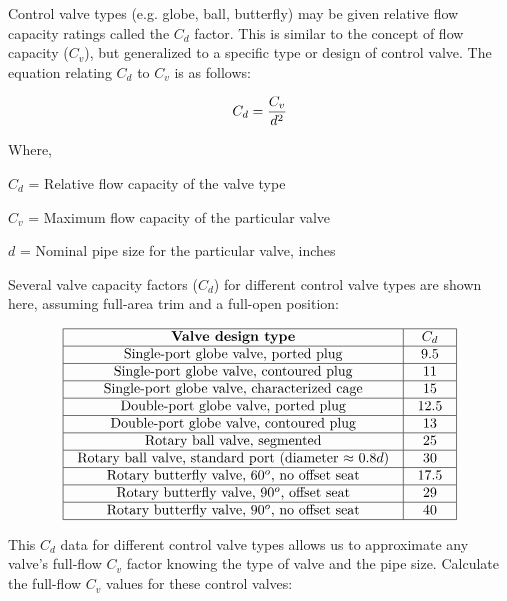 

Control valve types (e.g. globe, ball, butterfly) may be given relative flow capacity ratings called the $C_d$ factor.  This is similar to the concept of flow capacity ($C_v$), but generalized to a specific type or design of control valve.  The equation relating $C_d$ to $C_v$ is as follows:

$$C_d = {C_v \over d^2}$$

\noindent
Where,

$C_d$ = Relative flow capacity of the valve type

$C_v$ = Maximum flow capacity of the particular valve

$d$ = Nominal pipe size for the particular valve, inches

\vskip 10pt

Several valve capacity factors ($C_d$) for different control valve types are shown here, assuming full-area trim and a full-open position:
 

$$\vbox{\offinterlineskip
\halign{\strut
\vrule \quad\hfil # \ \hfil & 
\vrule \quad\hfil # \ \hfil \vrule \cr
\noalign{\hrule}
%
{\bf Valve design type} & $C_d$ \cr
%
\noalign{\hrule}
%
Single-port globe valve, ported plug & 9.5 \cr
%
\noalign{\hrule}
%
Single-port globe valve, contoured plug & 11 \cr
%
\noalign{\hrule}
%
Single-port globe valve, characterized cage & 15 \cr
%
\noalign{\hrule}
%
Double-port globe valve, ported plug & 12.5 \cr
%
\noalign{\hrule}
%
Double-port globe valve, contoured plug & 13 \cr
%
\noalign{\hrule}
%
Rotary ball valve, segmented & 25 \cr
%
\noalign{\hrule}
%
Rotary ball valve, standard port (diameter $\approx$ 0.8$d$) & 30 \cr
%
\noalign{\hrule}
%
Rotary butterfly valve, 60$^{o}$, no offset seat & 17.5 \cr
%
\noalign{\hrule}
%
Rotary butterfly valve, 90$^{o}$, offset seat & 29 \cr
%
\noalign{\hrule}
%
Rotary butterfly valve, 90$^{o}$, no offset seat & 40 \cr
%
\noalign{\hrule}
} %
}$$ %

This $C_d$ data for different control valve types allows us to approximate any valve's full-flow $C_v$ factor knowing the type of valve and the pipe size.  Calculate the full-flow $C_v$ values for these control valves:

